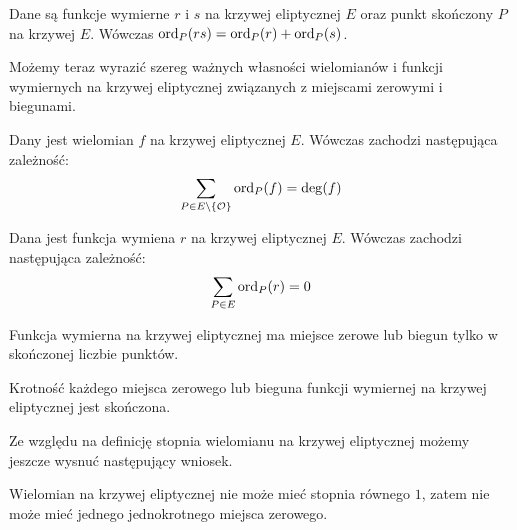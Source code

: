 \begin{theorem}
Dane są funkcje wymierne $r$ i $s$ na krzywej eliptycznej $E$
oraz punkt skończony $P$ na krzywej $E$.
Wówczas $\operatorname{ord}_P(rs) = \operatorname{ord}_P(r) + \operatorname{ord}_P(s)$.
\end{theorem}

\noindent
Możemy teraz wyrazić szereg ważnych własności
wielomianów i funkcji wymiernych na krzywej eliptycznej
związanych z miejscami zerowymi i biegunami.

\begin{theorem}\label{polynomial_ord_deg_theorem}
Dany jest wielomian $f$ na krzywej eliptycznej $E$.
Wówczas zachodzi następująca zależność:
\begin{equation*}
\sum_{P \in E\setminus \{\mathcal{O}\}} \operatorname{ord}_P(f) = \deg(f)
\end{equation*}
\end{theorem}

\begin{corollary}\label{function_order_sum_zero_corollary}
Dana jest funkcja wymiena $r$ na krzywej eliptycznej $E$.
Wówczas zachodzi następująca zależność:
\begin{equation*}
\sum_{P \in E} \operatorname{ord}_P(r) = 0
\end{equation*}
\end{corollary}

\begin{corollary}
Funkcja wymierna na krzywej eliptycznej ma miejsce zerowe lub biegun
tylko w skończonej liczbie punktów.
\end{corollary}

\begin{corollary}
Krotność każdego miejsca zerowego lub bieguna
funkcji wymiernej na krzywej eliptycznej
jest skończona.
\end{corollary}

\noindent
Ze względu na definicję stopnia wielomianu na krzywej eliptycznej
możemy jeszcze wysnuć następujący wniosek.

\begin{corollary}\label{poly_no_single_zero_corollary}
Wielomian na krzywej eliptycznej nie może mieć stopnia równego $1$,
zatem nie może mieć jednego jednokrotnego miejsca zerowego.
\end{corollary}
